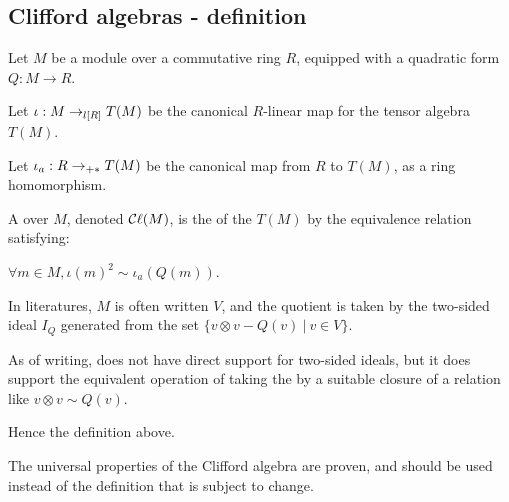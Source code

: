 \subsection{Clifford algebras - definition}
\label{sec:def}

\begin{definition}
    \label{CliffordAlgebra}
    \leanok

    Let $M$ be a module over a commutative ring $R$, equipped with a quadratic form $Q: M \to R$.

    Let $\iota : M \lmap{R} T(M)$ be the canonical $R$-linear map for the tensor algebra $T(M)$.

    Let $\iota_a : R \amap{R} T(M)$ be the canonical map from $R$ to $T(M)$, as a ring homomorphism.

    A  over $M$, denoted $\Cl (M)$, is
    the  of the  $T(M)$
    by the equivalence relation satisfying:

    $\forall m \in M, \iota(m)^2 \sim \iota_a(Q(m))$.
\end{definition}

\begin{remark}
  \label{mk:two_sided_ideals}
  
  In literatures, $M$ is often written $V$, and the quotient is taken by the two-sided ideal $I_Q$ generated from the set
  $\{ v \otimes v - Q(v) \:\vert\: v \in V \}$.

  As of writing, \Mathlib does not have direct support for two-sided ideals,
  but it does support the equivalent operation of taking the  by a suitable closure of
  a relation like $v \otimes v \sim Q(v)$.

  Hence the definition above.

  The universal properties of the Clifford algebra are proven, and should be used instead of the definition
  that is subject to change.

  \begin{figure}[H]
    \centering
  \end{figure}

\end{remark}

